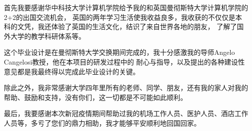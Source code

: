 \documentclass[supercite]{HustGraduPaper}
\theoremstyle{definition}
\begin{document}
\begin{thankpage}

首先我要感谢华中科技大学计算机学院给予我的和英国曼彻斯特大学计算机学院的2+2的出国交流机会，
英国的两年学习生活使我收益良多，我收获的不仅仅是本科的文凭，我还体验了英国的生活文化，结识了来自世界各地的朋友，
了解了国外大学的教学科研体系等。

这个毕业设计是在曼彻斯特大学交换期间完成的，我十分感激我的导师Angelo Cangelosi教授，他在本项目的研发过程中的
耐心与指导，以及提出的各种建设性意见都是我最终得以完成此毕业设计的关键。

除此之外，我非常感谢大学四年里所有的老师、同学、朋友，还有我的家人对我的帮助、鼓励和支持，没有你们，这一切都是不可能如此顺利。

最后，我要感谢本次新冠疫情期间帮助过我的机场工作人员、医护人员、酒店工作人员等，多亏了您们的鼎力相助，我才能够平安顺利地回国回家。

\end{thankpage}

\nocite{*}



\appendix

\end{document}
